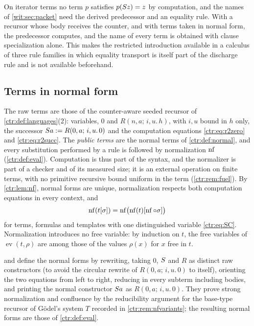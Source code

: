 On iterator terms no term $p$ satisfies $p(S z)=z$ by computation, and the
names of \cref{wit:sec:packet} need the derived predecessor and an equality
rule.  With a recursor whose body receives the counter, and with terms taken
in normal form, the predecessor computes, and the name of every term is
obtained with clause specialization alone.  This makes the restricted
introduction available in a calculus of three rule families in which
equality transport is itself part of the discharge rule and is not available
beforehand.

\subsection{Terms in normal form}

The raw terms are those of the counter-aware seeded recursor of
\cref{ctr:def:languages}(2): variables, $0$ and $R(n,a;\,i,u.\,h)$, with
$i,u$ bound in $h$ only, the successor $S a\mathrel{:=} R(0,a;\,i,u.\,0)$ and
the computation equations \eqref{ctr:eq:r2zero} and \eqref{ctr:eq:r2succ}.
The \emph{public terms} are the normal terms of \cref{ctr:def:normal}, and
every substitution performed by a rule is followed by normalization $\operatorname{nf}$
(\cref{ctr:def:eval}).  Computation is thus part of the syntax, and the
normalizer is part of a checker and of its measured size; it is an external
operation on finite terms, with no primitive recursive bound uniform in the
term (\cref{ctr:rem:fuel}).  By \cref{ctr:lem:nf}, normal forms are unique,
normalization respects both computation equations in every context, and
\[
 \operatorname{nf}(t[\sigma])=\operatorname{nf}\bigl(\operatorname{nf}(t)[\operatorname{nf}\circ\sigma]\bigr)
\]
for terms, formulas and templates with one distinguished variable
\eqref{ctr:eq:SC}.  Normalization introduces no free variable: by
induction on $t$, the free variables of $\operatorname{ev}(t,\rho)$ are
among those of the values $\rho(x)$ for $x$ free in $t$.

\begin{remark}
\label{wit:rem:nf}
 and  define the normal forms
by rewriting, taking $0$, $S$ and $R$ as distinct raw constructors (to
avoid the circular rewrite of $R(0,a;\,i,u.\,0)$ to itself), orienting the
two equations from left to right, reducing in every subterm including
bodies, and printing the normal constructor $S a$ as
$R(0,a;\,i,u.\,0)$.  They prove strong normalization and confluence by the
reducibility argument for the base-type recursor of G\"odel's system $T$
recorded in \cref{ctr:rem:nfvariants}; the resulting normal forms are those
of \cref{ctr:def:eval}.
\end{remark}

